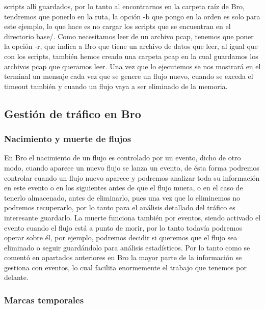 {{{scripts allí guardados, por lo tanto al encontrarnos en la carpeta raíz 
de Bro, tendremos que ponerlo en la ruta, la opción -b que pongo en la 
orden es solo para este ejemplo, lo que hace es no cargar los scripts 
que se encuentran en el directorio base/. Como necesitamos leer de un 
archivo pcap, tenemos que poner la opción -r, que indica a Bro que tiene 
un archivo de datos que leer, al igual que con los scripts, también hemos 
creado una carpeta pcap en la cual guardamos los archivos pcap que queramos 
leer. Una vez que lo ejecutemos se nos mostrará en el terminal un mensaje 
cada vez que se genere un flujo nuevo, cuando se exceda el timeout también 
y cuando un flujo vaya a ser eliminado de la memoria.

\subsection{Gestión de tráfico en Bro}

\subsubsection{Nacimiento y muerte de flujos}

En Bro el nacimiento de un flujo es controlado por un evento, dicho de otro 
modo, cuando aparece un nuevo flujo se lanza un evento, de ésta forma podremos 
controlar cuando un flujo nuevo aparece y podremos analizar toda su información 
en este evento o en los siguientes antes de que el flujo muera, o en el caso de 
tenerlo almacenado, antes de eliminarlo, pues una vez que lo eliminemos no 
podremos recuperarlo, por lo tanto para el análisis detallado del tráfico es 
interesante guardarlo.
\intro
La muerte funciona también por eventos, siendo activado el evento cuando el 
flujo está a punto de morir, por lo tanto todavía podremos operar sobre él, 
por ejemplo, podremos decidir si queremos que el flujo sea eliminado o seguir 
guardándolo para análisis estadísticos.
\intro
Por lo tanto como se comentó en apartados anteriores en Bro la mayor parte de 
la información se gestiona con eventos, lo cual facilita enormemente el trabajo 
que tenemos por delante.

\subsubsection{Marcas temporales}

}}}
